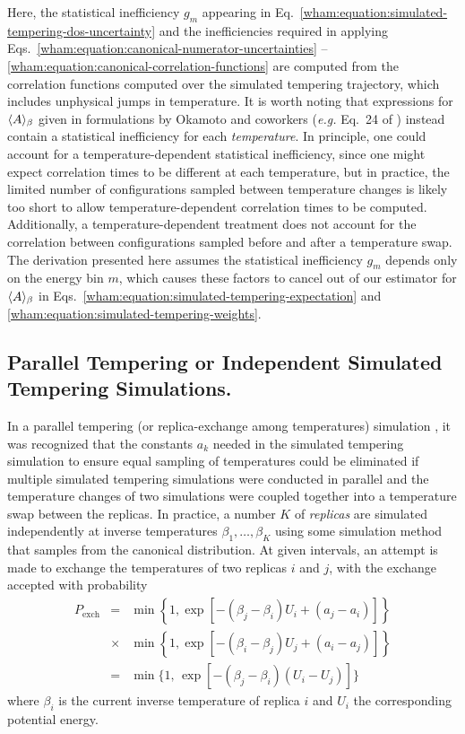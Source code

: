Here, the statistical inefficiency $g_m$ appearing in Eq.\ \ref{wham:equation:simulated-tempering-dos-uncertainty} and the inefficiencies required in applying Eqs.\ \ref{wham:equation:canonical-numerator-uncertainties} -- \ref{wham:equation:canonical-correlation-functions} are computed from the correlation functions computed over the simulated tempering trajectory, which includes unphysical jumps in temperature.  It is worth noting that expressions for $\langle A \rangle_\beta$ given in formulations by Okamoto and coworkers (\emph{e.g.} Eq.\ 24 of \cite{mitsutake:2004a}) instead contain a statistical inefficiency for each \emph{temperature}.  In principle, one could account for a temperature-dependent statistical inefficiency, since one might expect correlation times to be different at each temperature, but in practice, the limited number of configurations sampled between temperature changes is likely too short to allow temperature-dependent correlation times to be computed.  Additionally, a temperature-dependent treatment does not account for the correlation between configurations sampled before and after a temperature swap.  The derivation presented here assumes the statistical inefficiency $g_m$ depends only on the energy bin $m$, which causes these factors to cancel out of our estimator for $\langle A \rangle_\beta$ in Eqs.\ \ref{wham:equation:simulated-tempering-expectation} and \ref{wham:equation:simulated-tempering-weights}.

\subsection{Parallel Tempering or Independent Simulated Tempering Simulations.}
\label{wham:section:parallel-tempering}

In a parallel tempering (or replica-exchange among temperatures) simulation \cite{hansmann:1997a,sugita:1999a}, it was recognized that the constants $a_k$ needed in the simulated tempering simulation to ensure equal sampling of temperatures could be eliminated if multiple simulated tempering simulations were conducted in parallel and the temperature changes of two simulations were coupled together into a temperature swap between the replicas.  In practice, a number $K$ of \emph{replicas} are simulated independently at inverse temperatures $\beta_1,\ldots,\beta_K$ using some simulation method that samples from the canonical distribution.  At given intervals, an attempt is made to exchange the temperatures of two replicas $i$ and $j$, with the exchange accepted with probability
\begin{eqnarray}
P_\mathrm{exch} &=& \min\left\{ 1, \exp[- (\beta_j - \beta_i) U_i + (a_j - a_i)] \right\} \nonumber \\
&\times& \min\left\{ 1, \exp[- (\beta_i - \beta_j) U_j + (a_i - a_j)] \right\} \nonumber \\
&=& \min \{ 1, \, \exp[- (\beta_j - \beta_i) (U_i - U_j)] \}
\end{eqnarray}
where $\beta_i$ is the current inverse temperature of replica $i$ and $U_i$ the corresponding potential energy.

